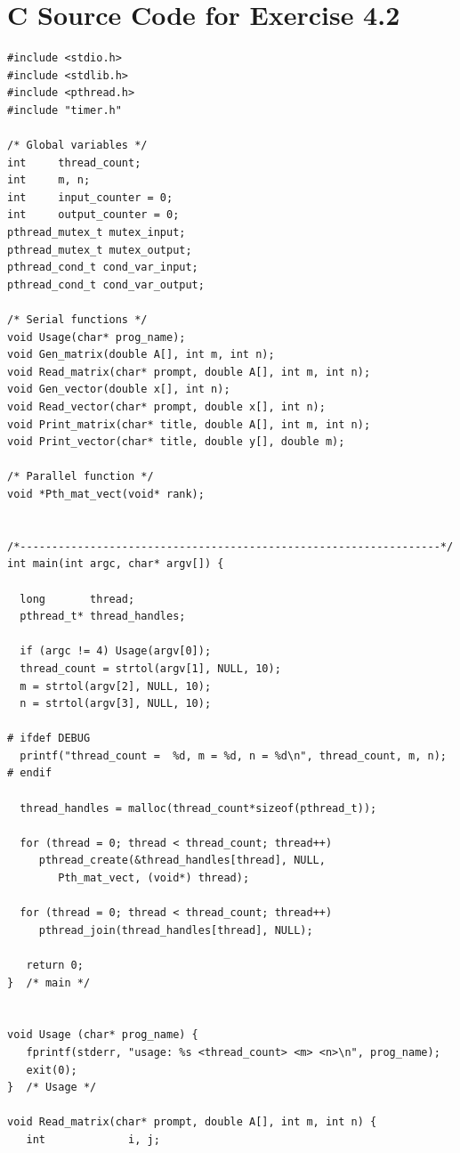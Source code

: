 \documentclass[a4paper,11pt,twoside]{article}
\begin{document}


\appendix

\section{C Source Code for Exercise 4.2}{\label{app:source4.2}
\begin{verbatim}
#include <stdio.h>
#include <stdlib.h>
#include <pthread.h>
#include "timer.h"

/* Global variables */
int     thread_count;
int     m, n;
int     input_counter = 0;
int     output_counter = 0;
pthread_mutex_t mutex_input;
pthread_mutex_t mutex_output;
pthread_cond_t cond_var_input;
pthread_cond_t cond_var_output;

/* Serial functions */
void Usage(char* prog_name);
void Gen_matrix(double A[], int m, int n);
void Read_matrix(char* prompt, double A[], int m, int n);
void Gen_vector(double x[], int n);
void Read_vector(char* prompt, double x[], int n);
void Print_matrix(char* title, double A[], int m, int n);
void Print_vector(char* title, double y[], double m);

/* Parallel function */
void *Pth_mat_vect(void* rank);


/*------------------------------------------------------------------*/
int main(int argc, char* argv[]) {
  
  long       thread;
  pthread_t* thread_handles;

  if (argc != 4) Usage(argv[0]);
  thread_count = strtol(argv[1], NULL, 10);
  m = strtol(argv[2], NULL, 10);
  n = strtol(argv[3], NULL, 10);

# ifdef DEBUG
  printf("thread_count =  %d, m = %d, n = %d\n", thread_count, m, n);
# endif

  thread_handles = malloc(thread_count*sizeof(pthread_t));

  for (thread = 0; thread < thread_count; thread++)
     pthread_create(&thread_handles[thread], NULL,
        Pth_mat_vect, (void*) thread);

  for (thread = 0; thread < thread_count; thread++)
     pthread_join(thread_handles[thread], NULL);
  
   return 0;
}  /* main */


void Usage (char* prog_name) {
   fprintf(stderr, "usage: %s <thread_count> <m> <n>\n", prog_name);
   exit(0);
}  /* Usage */

void Read_matrix(char* prompt, double A[], int m, int n) {
   int             i, j;


\end{verbatim}}
\end{document}

